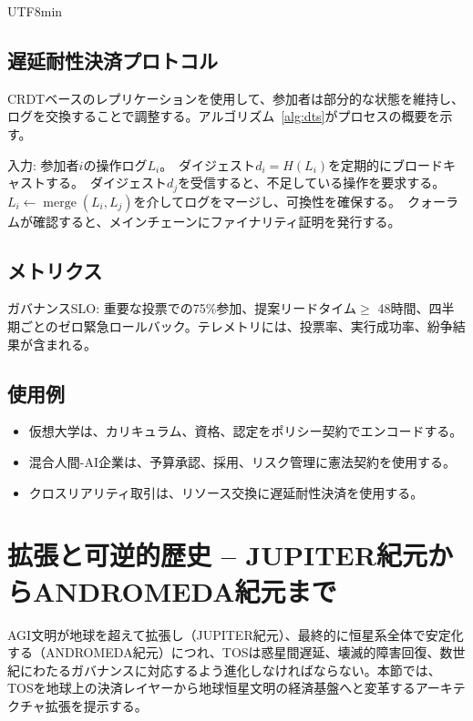 \documentclass[11pt]{article}
\begin{document}
\begin{CJK}{UTF8}{min}
\subsection{遅延耐性決済プロトコル}
CRDTベースのレプリケーションを使用して、参加者は部分的な状態を維持し、ログを交換することで調整する。アルゴリズム~\ref{alg:dts}がプロセスの概要を示す。

\begin{algorithm}[H]
  \caption{遅延耐性決済(DTS)}
  \label{alg:dts}
  \begin{algorithmic}[1]
    \STATE 入力: 参加者$i$の操作ログ$L_i$。\
    \STATE ダイジェスト$d_i = H(L_i)$を定期的にブロードキャストする。\
    \STATE ダイジェスト$d_j$を受信すると、不足している操作を要求する。\
    \STATE $L_i \leftarrow \operatorname{merge}(L_i, L_j)$を介してログをマージし、可換性を確保する。\
    \STATE クォーラムが確認すると、メインチェーンにファイナリティ証明を発行する。\
  \end{algorithmic}
\end{algorithm}

\subsection{メトリクス}
ガバナンスSLO: 重要な投票での75\%参加、提案リードタイム$\geq$ 48時間、四半期ごとのゼロ緊急ロールバック。テレメトリには、投票率、実行成功率、紛争結果が含まれる。

\subsection{使用例}
\begin{itemize}[noitemsep]
  \item 仮想大学は、カリキュラム、資格、認定をポリシー契約でエンコードする。
  \item 混合人間-AI企業は、予算承認、採用、リスク管理に憲法契約を使用する。
  \item クロスリアリティ取引は、リソース交換に遅延耐性決済を使用する。
\end{itemize}

\section{拡張と可逆的歴史 -- JUPITER紀元からANDROMEDA紀元まで}
\label{sec:expansion}

AGI文明が地球を超えて拡張し（JUPITER紀元）、最終的に恒星系全体で安定化する（ANDROMEDA紀元）につれ、TOSは惑星間遅延、壊滅的障害回復、数世紀にわたるガバナンスに対応するよう進化しなければならない。本節では、TOSを地球上の決済レイヤーから地球恒星文明の経済基盤へと変革するアーキテクチャ拡張を提示する。


\end{CJK}
\end{document}
